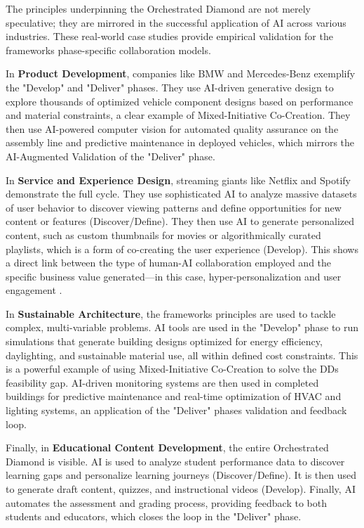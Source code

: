 \documentclass[
  12pt,
  a4paper,
  bibliography=totoc,
  numbers=noenddot
]{scrartcl}
\begin{document}
The principles underpinning the Orchestrated Diamond are not merely
speculative; they are mirrored in the successful application of AI
across various industries. These real-world case studies provide
empirical validation for the framework\textquotesingle s phase-specific
collaboration models.

In \textbf{Product Development}, companies like BMW and Mercedes-Benz
exemplify the "Develop" and "Deliver" phases. They use AI-driven
generative design to explore thousands of optimized vehicle component
designs based on performance and material constraints, a clear example
of Mixed-Initiative Co-Creation.\cite{mindinventory2025role} They then use
AI-powered computer vision for automated quality assurance on the
assembly line and predictive maintenance in deployed vehicles, which
mirrors the AI-Augmented Validation of the "Deliver"
phase.\cite{mindinventory2025role}

In \textbf{Service and Experience Design}, streaming giants like Netflix
and Spotify demonstrate the full cycle. They use sophisticated AI to
analyze massive datasets of user behavior to discover viewing patterns
and define opportunities for new content or features
(Discover/Define).\cite{mindinventory2025role} They then use AI to generate
personalized content, such as custom thumbnails for movies or
algorithmically curated playlists, which is a form of co-creating the
user experience (Develop).\cite{logrocket2025designers} This shows a direct link
between the type of human-AI collaboration employed and the specific
business value generated---in this case, hyper-personalization and user
engagement \cite{ibm2025ai}.

In \textbf{Sustainable Architecture}, the framework\textquotesingle s
principles are used to tackle complex, multi-variable problems. AI tools
are used in the "Develop" phase to run simulations that generate
building designs optimized for energy efficiency, daylighting, and
sustainable material use, all within defined cost
constraints.\cite{aecassociates2025transforming} This is a powerful example of using
Mixed-Initiative Co-Creation to solve the DD\textquotesingle s
feasibility gap. AI-driven monitoring systems are then used in completed
buildings for predictive maintenance and real-time optimization of HVAC
and lighting systems, an application of the "Deliver"
phase\textquotesingle s validation and feedback
loop.\cite{aecassociates2025transforming}

Finally, in \textbf{Educational Content Development}, the entire
Orchestrated Diamond is visible. AI is used to analyze student
performance data to discover learning gaps and personalize learning
journeys (Discover/Define).\cite{vktr2025ai} It is then used to
generate draft content, quizzes, and instructional videos
(Develop).\cite{vktr2025ai} Finally, AI automates the assessment and
grading process, providing feedback to both students and educators,
which closes the loop in the "Deliver" phase.\cite{frontiers2025developing}
\end{document}
